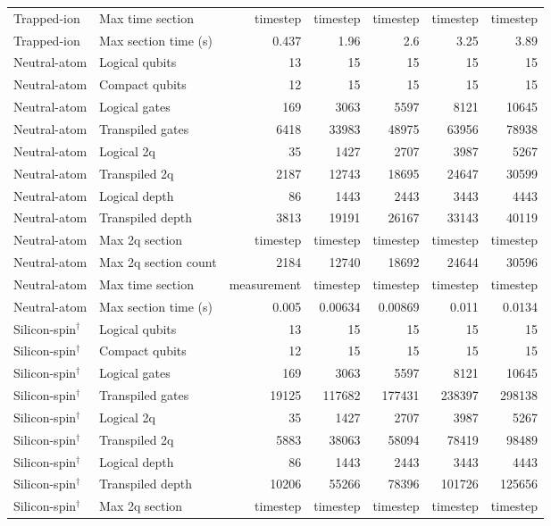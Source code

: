 \begin{table}
\begin{tabular}{llrrrrr}
Trapped-ion & Max time section & timestep & timestep & timestep & timestep & timestep \\
Trapped-ion & Max section time (s) & 0.437 & 1.96 & 2.6 & 3.25 & 3.89 \\
\hline
Neutral-atom & Logical qubits & 13 & 15 & 15 & 15 & 15 \\
Neutral-atom & Compact qubits & 12 & 15 & 15 & 15 & 15 \\
Neutral-atom & Logical gates & 169 & 3063 & 5597 & 8121 & 10645 \\
Neutral-atom & Transpiled gates & 6418 & 33983 & 48975 & 63956 & 78938 \\
Neutral-atom & Logical 2q & 35 & 1427 & 2707 & 3987 & 5267 \\
Neutral-atom & Transpiled 2q & 2187 & 12743 & 18695 & 24647 & 30599 \\
Neutral-atom & Logical depth & 86 & 1443 & 2443 & 3443 & 4443 \\
Neutral-atom & Transpiled depth & 3813 & 19191 & 26167 & 33143 & 40119 \\
Neutral-atom & Max 2q section & timestep & timestep & timestep & timestep & timestep \\
Neutral-atom & Max 2q section count & 2184 & 12740 & 18692 & 24644 & 30596 \\
Neutral-atom & Max time section & measurement & timestep & timestep & timestep & timestep \\
Neutral-atom & Max section time (s) & 0.005 & 0.00634 & 0.00869 & 0.011 & 0.0134 \\
\hline
Silicon-spin$^{\dagger}$ & Logical qubits & 13 & 15 & 15 & 15 & 15 \\
Silicon-spin$^{\dagger}$ & Compact qubits & 12 & 15 & 15 & 15 & 15 \\
Silicon-spin$^{\dagger}$ & Logical gates & 169 & 3063 & 5597 & 8121 & 10645 \\
Silicon-spin$^{\dagger}$ & Transpiled gates & 19125 & 117682 & 177431 & 238397 & 298138 \\
Silicon-spin$^{\dagger}$ & Logical 2q & 35 & 1427 & 2707 & 3987 & 5267 \\
Silicon-spin$^{\dagger}$ & Transpiled 2q & 5883 & 38063 & 58094 & 78419 & 98489 \\
Silicon-spin$^{\dagger}$ & Logical depth & 86 & 1443 & 2443 & 3443 & 4443 \\
Silicon-spin$^{\dagger}$ & Transpiled depth & 10206 & 55266 & 78396 & 101726 & 125656 \\
Silicon-spin$^{\dagger}$ & Max 2q section & timestep & timestep & timestep & timestep & timestep \\

\end{tabular}
\end{table}
